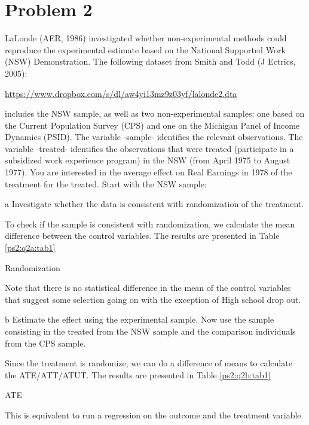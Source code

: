 \documentclass{article}
\begin{document}
\section*{Problem 2}
LaLonde (AER, 1986) investigated whether non-experimental methods could reproduce the experimental estimate based on the National Supported Work (NSW) Demonstration. The following dataset from Smith and Todd (J Ectrics, 2005):
\begin{center}
    \hyperlink{https://www.dropbox.com/s/dl/aw4yi13mz9z03yf/lalonde2.dta}{https://www.dropbox.com/s/dl/aw4yi13mz9z03yf/lalonde2.dta}
\end{center}
includes the NSW sample, as well as two non-experimental samples: one based on the Current Population Survey (CPS) and one on the Michigan Panel of Income Dynamics (PSID). The variable -sample- identifies the relevant observations. The variable -treated- identifies the observations that were treated (participate in a subsidized work experience program) in the NSW (from April 1975 to August 1977). You are interested in the average effect on Real Earnings in 1978 of the treatment for the treated. Start with the NSW sample:
\begin{problem}{a}
Investigate whether the data is consistent with randomization of the treatment.
\end{problem}
\begin{solution}
To check if the sample is consistent with randomization, we calculate the mean difference between the control variables. The results are presented in Table \ref{ps2:q2a:tab1}
\begin{table}[htb]
    \centering
    \caption{Randomization}
    \label{ps2:q2a:tab1}
    
\end{table}
Note that there is no statistical difference in the mean of the control variables that suggest some selection going on with the exception of High school drop out. 


\end{solution}

\begin{problem}{b}
Estimate the effect using the experimental sample. Now use the sample consisting in the treated from the NSW sample and the comparison individuals from the CPS sample.
\end{problem}
\begin{solution}
Since the treatment is randomize, we can do a difference of means to calculate the ATE/ATT/ATUT. The results are presented in Table \ref{ps2:q2b:tab1}
\begin{table}[htb]
    \centering
    \caption{ATE}
    \label{ps2:q2b:tab1}
    
\end{table}
This is equivalent to run a regression on the outcome and the treatment variable. 
\end{solution}
\end{document}
